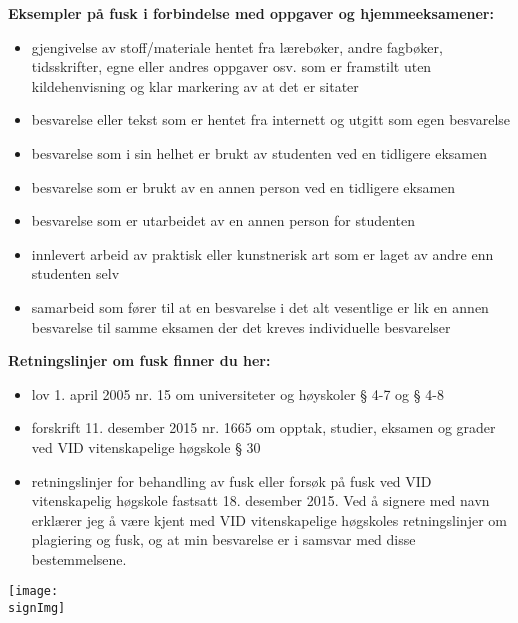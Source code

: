 \begin{scriptsize}
\textbf{Eksempler på fusk i forbindelse med oppgaver og hjemmeeksamener:}
\begin{itemize}
\item gjengivelse av stoff/materiale hentet fra lærebøker, andre fagbøker, tidsskrifter, egne eller andres oppgaver osv. som er framstilt uten kildehenvisning og klar markering av at det er sitater 
\item besvarelse eller tekst som er hentet fra internett og utgitt som egen besvarelse 
\item besvarelse som i sin helhet er brukt av studenten ved en tidligere eksamen 
\item besvarelse som er brukt av en annen person ved en tidligere eksamen 
\item besvarelse som er utarbeidet av en annen person for studenten 
\item innlevert arbeid av praktisk eller kunstnerisk art som er laget av andre enn studenten selv 
\item samarbeid som fører til at en besvarelse i det alt vesentlige er lik en annen besvarelse til samme eksamen der det kreves individuelle besvarelser
\end{itemize}

\textbf{Retningslinjer om fusk finner du her:}
\begin{itemize}
\item lov 1. april 2005 nr. 15 om universiteter og høyskoler § 4-7 og § 4-8 
\item forskrift 11. desember 2015 nr. 1665 om opptak, studier, eksamen og grader ved VID vitenskapelige høgskole § 30
\item retningslinjer for behandling av fusk eller forsøk på fusk ved VID vitenskapelig høgskole fastsatt 18. desember 2015.
Ved å signere med navn erklærer jeg å være kjent med VID vitenskapelige høgskoles retningslinjer om plagiering og fusk, og at min besvarelse er i samsvar med disse bestemmelsene.
\end{itemize}
\end{scriptsize}
\begin{center}
	\vspace{.3cm}
	\texttt{[image: \\signImg]}
\end{center}
